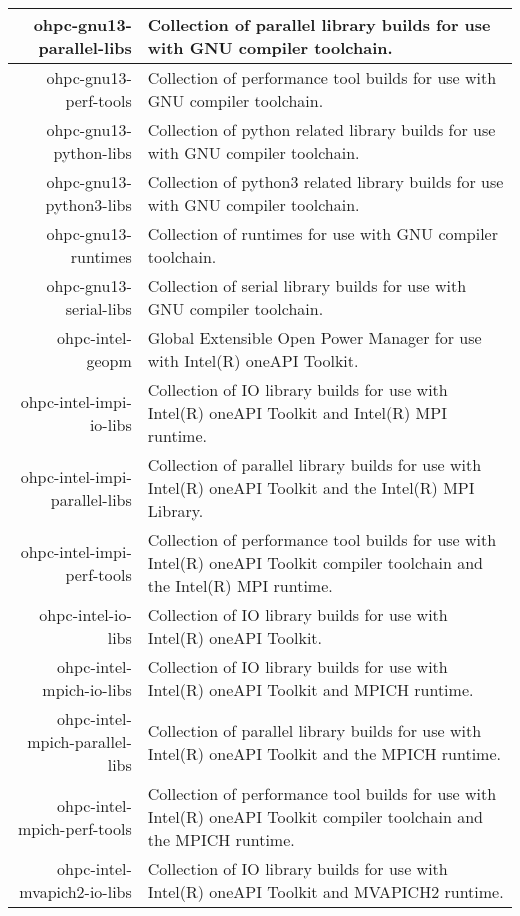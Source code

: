 \begin{tabularx}{\textwidth}{r|X}
\hline
ohpc-gnu13-parallel-libs & Collection of parallel library builds for use with GNU compiler toolchain. \\
\hline
ohpc-gnu13-perf-tools & Collection of performance tool builds for use with GNU compiler toolchain. \\
\hline
ohpc-gnu13-python-libs & Collection of python related library builds for use with GNU compiler toolchain. \\
\hline
ohpc-gnu13-python3-libs & Collection of python3 related library builds for use with GNU compiler toolchain. \\
\hline
ohpc-gnu13-runtimes & Collection of runtimes for use with GNU compiler toolchain. \\
\hline
ohpc-gnu13-serial-libs & Collection of serial library builds for use with GNU compiler toolchain. \\
\hline
ohpc-intel-geopm & Global Extensible Open Power Manager for use with Intel(R) oneAPI Toolkit. \\
\hline
ohpc-intel-impi-io-libs & Collection of IO library builds for use with Intel(R) oneAPI Toolkit and Intel(R) MPI runtime. \\
\hline
ohpc-intel-impi-parallel-libs & Collection of parallel library builds for use with Intel(R) oneAPI Toolkit and the Intel(R) MPI Library. \\
\hline
ohpc-intel-impi-perf-tools & Collection of performance tool builds for use with Intel(R) oneAPI Toolkit compiler toolchain and the Intel(R) MPI runtime. \\
\hline
ohpc-intel-io-libs & Collection of IO library builds for use with Intel(R) oneAPI Toolkit. \\
\hline
ohpc-intel-mpich-io-libs & Collection of IO library builds for use with Intel(R) oneAPI Toolkit and MPICH runtime. \\
\hline
ohpc-intel-mpich-parallel-libs & Collection of parallel library builds for use with Intel(R) oneAPI Toolkit and the MPICH runtime. \\
\hline
ohpc-intel-mpich-perf-tools & Collection of performance tool builds for use with Intel(R) oneAPI Toolkit compiler toolchain and the MPICH runtime. \\
\hline
ohpc-intel-mvapich2-io-libs & Collection of IO library builds for use with Intel(R) oneAPI Toolkit and MVAPICH2 runtime. \\
\hline
\bottomrule
\end{tabularx}
